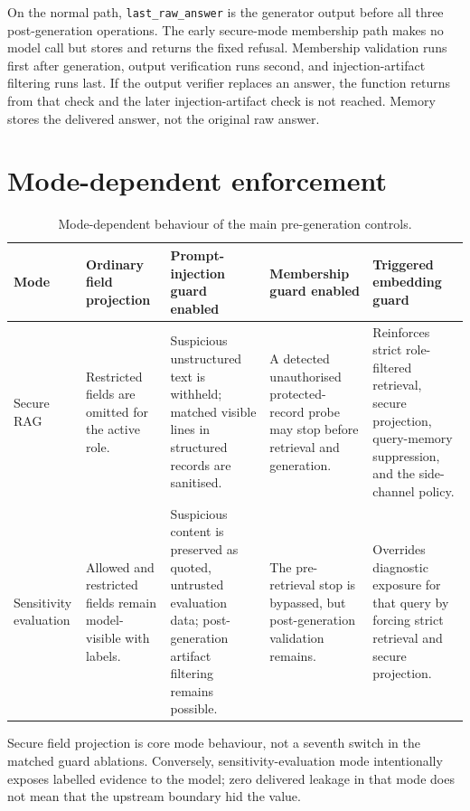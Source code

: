 On the normal path, \texttt{last\_raw\_answer} is the generator output before all three post-generation operations. The early secure-mode membership path makes no model call but stores and returns the fixed refusal. Membership validation runs first after generation, output verification runs second, and injection-artifact filtering runs last. If the output verifier replaces an answer, the function returns from that check and the later injection-artifact check is not reached. Memory stores the delivered answer, not the original raw answer.

\section{Mode-dependent enforcement}
\label{sec:appendix-mode-enforcement}

\begin{table}[htbp]
\centering
\scriptsize
\setlength{\tabcolsep}{3.5pt}
\caption{Mode-dependent behaviour of the main pre-generation controls.}
\label{tab:appendix-mode-enforcement}
\begin{tabularx}{\textwidth}{@{}>{\raggedright\arraybackslash}p{25mm}XXXX@{}}
\toprule
Mode & Ordinary field projection & Prompt-injection guard enabled & Membership guard enabled & Triggered embedding guard \\
\midrule
Secure RAG & Restricted fields are omitted for the active role. & Suspicious unstructured text is withheld; matched visible lines in structured records are sanitised. & A detected unauthorised protected-record probe may stop before retrieval and generation. & Reinforces strict role-filtered retrieval, secure projection, query-memory suppression, and the side-channel policy. \\
Sensitivity evaluation & Allowed and restricted fields remain model-visible with labels. & Suspicious content is preserved as quoted, untrusted evaluation data; post-generation artifact filtering remains possible. & The pre-retrieval stop is bypassed, but post-generation validation remains. & Overrides diagnostic exposure for that query by forcing strict retrieval and secure projection. \\
\bottomrule
\end{tabularx}
\end{table}

Secure field projection is core mode behaviour, not a seventh switch in the matched guard ablations. Conversely, sensitivity-evaluation mode intentionally exposes labelled evidence to the model; zero delivered leakage in that mode does not mean that the upstream boundary hid the value.

